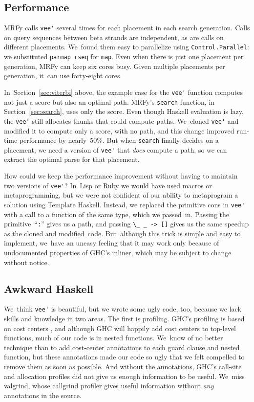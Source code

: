 \documentclass[preprint,nonatbib,blockstyle,nocopyrightspace,times]{sigplanconf}
\newcommand\secref[1]{Section~\ref{sec:#1}}
\newcommand\seclabel[1]{\label{sec:#1}}
\let\cite\citep
\begin{document}
\subsection{Performance}

\seclabel{perf}

MRFy calls \verb+vee'+ several
 times
for each placement in each search generation.
Calls on query sequences between beta strands are independent,
as are calls on different placements.
We~found them easy to parallelize
using
\texttt{Control.Parallel}:
we substituted
\texttt{parmap rseq} for \texttt{map}.
Even when there is just one placement per generation,
MRFy can keep six cores busy.
Given multiple placements per generation,
it~can use forty-eight cores.


In~\secref{viterbi} above, the example case for the \verb+vee'+
function computes not just a score but also an optimal path.
MRFy's \texttt{search} function, in \secref{search}, uses only the
score.
Even though Haskell evaluation is lazy, the \verb+vee'+ 
still allocates thunks that could compute paths.
We~cloned \verb+vee'+ and modified it to compute
only a score, with no path, and this change improved 
run-time performance by nearly~50\%.
But when \texttt{search} finally decides on a placement, we need a
version of \verb+vee'+ that \emph{does} compute a path, so we can
extract the optimal parse for that placement.

How could we keep the performance improvement without having to
maintain two versions of \verb+vee'+?
In~Lisp or Ruby we would have used macros or metaprogramming,
but we were not confident of our ability to metaprogram a solution
using Template Haskell.
Instead, we replaced the primitive cons in \verb+vee'+ with a
call to a function of the same type, which we passed~in.
Passing the primitive~``\texttt{:}'' gives us a path,
and passing \verb+\_ _ -> []+ gives us the same
speedup as the cloned and modified~code.
But~although
this trick is simple and easy to implement, 
we~have an uneasy feeling that it may work only because of undocumented
properties of GHC's inliner, which may be subject to change without
notice. 

\subsection{Awkward Haskell}

\seclabel{awkward-profiling}

We~think \verb+vee'+ is beautiful, but we wrote some ugly code, too,
because we lack skills and knowledge in two areas.
The first is profiling.
GHC's profiling is based on cost centers \cite{sansom-pj},
and although GHC 
will happily add cost centers to top-level 
functions, much of our code is in nested functions.
We~know of no better technique than to add cost-center annotations to
each guard clause and nested function,
but these annotations made our code so ugly that we felt compelled to
remove them as soon as possible.
And without the annotations, GHC's call-site and allocation
profiles did not give us enough information to be useful.
We~miss valgrind, whose callgrind profiler gives useful information
without \emph{any} annotations in the source.
\end{document}
